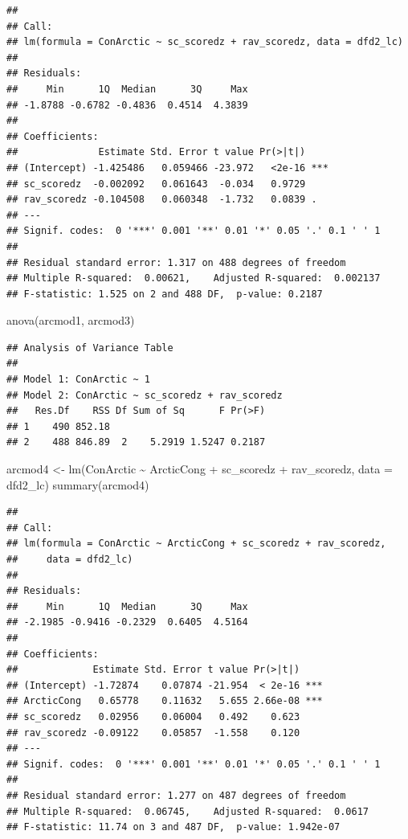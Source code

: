 \documentclass[
]{article}
\newenvironment{Shaded}{\begin{snugshade}}{\end{snugshade}}
\newcommand{\AttributeTok}[1]{\textcolor[rgb]{0.77,0.63,0.00}{#1}}
\newcommand{\FunctionTok}[1]{\textcolor[rgb]{0.00,0.00,0.00}{#1}}
\newcommand{\NormalTok}[1]{#1}
\newcommand{\OtherTok}[1]{\textcolor[rgb]{0.56,0.35,0.01}{#1}}
\newcommand{\SpecialCharTok}[1]{\textcolor[rgb]{0.00,0.00,0.00}{#1}}
\begin{document}
\begin{verbatim}
## 
## Call:
## lm(formula = ConArctic ~ sc_scoredz + rav_scoredz, data = dfd2_lc)
## 
## Residuals:
##     Min      1Q  Median      3Q     Max 
## -1.8788 -0.6782 -0.4836  0.4514  4.3839 
## 
## Coefficients:
##              Estimate Std. Error t value Pr(>|t|)    
## (Intercept) -1.425486   0.059466 -23.972   <2e-16 ***
## sc_scoredz  -0.002092   0.061643  -0.034   0.9729    
## rav_scoredz -0.104508   0.060348  -1.732   0.0839 .  
## ---
## Signif. codes:  0 '***' 0.001 '**' 0.01 '*' 0.05 '.' 0.1 ' ' 1
## 
## Residual standard error: 1.317 on 488 degrees of freedom
## Multiple R-squared:  0.00621,    Adjusted R-squared:  0.002137 
## F-statistic: 1.525 on 2 and 488 DF,  p-value: 0.2187
\end{verbatim}

\begin{Shaded}
\begin{Highlighting}[]
\FunctionTok{anova}\NormalTok{(arcmod1, arcmod3)}
\end{Highlighting}
\end{Shaded}

\begin{verbatim}
## Analysis of Variance Table
## 
## Model 1: ConArctic ~ 1
## Model 2: ConArctic ~ sc_scoredz + rav_scoredz
##   Res.Df    RSS Df Sum of Sq      F Pr(>F)
## 1    490 852.18                           
## 2    488 846.89  2    5.2919 1.5247 0.2187
\end{verbatim}

\begin{Shaded}
\begin{Highlighting}[]
\NormalTok{arcmod4 }\OtherTok{\textless{}{-}} \FunctionTok{lm}\NormalTok{(ConArctic }\SpecialCharTok{\textasciitilde{}}\NormalTok{ ArcticCong }\SpecialCharTok{+}\NormalTok{ sc\_scoredz }\SpecialCharTok{+}\NormalTok{ rav\_scoredz, }\AttributeTok{data =}\NormalTok{ dfd2\_lc)}
\FunctionTok{summary}\NormalTok{(arcmod4)}
\end{Highlighting}
\end{Shaded}

\begin{verbatim}
## 
## Call:
## lm(formula = ConArctic ~ ArcticCong + sc_scoredz + rav_scoredz, 
##     data = dfd2_lc)
## 
## Residuals:
##     Min      1Q  Median      3Q     Max 
## -2.1985 -0.9416 -0.2329  0.6405  4.5164 
## 
## Coefficients:
##             Estimate Std. Error t value Pr(>|t|)    
## (Intercept) -1.72874    0.07874 -21.954  < 2e-16 ***
## ArcticCong   0.65778    0.11632   5.655 2.66e-08 ***
## sc_scoredz   0.02956    0.06004   0.492    0.623    
## rav_scoredz -0.09122    0.05857  -1.558    0.120    
## ---
## Signif. codes:  0 '***' 0.001 '**' 0.01 '*' 0.05 '.' 0.1 ' ' 1
## 
## Residual standard error: 1.277 on 487 degrees of freedom
## Multiple R-squared:  0.06745,    Adjusted R-squared:  0.0617 
## F-statistic: 11.74 on 3 and 487 DF,  p-value: 1.942e-07
\end{verbatim}
\end{document}
